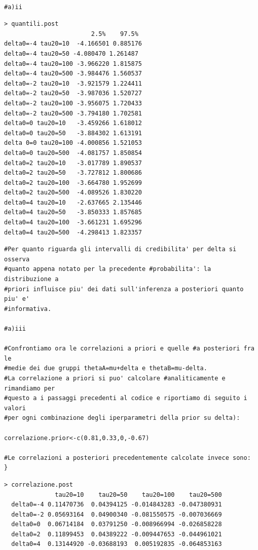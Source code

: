 \begin{itemize}
\begin{lstlisting}[style=R]

#a)ii
\end{lstlisting}
{
\color{red}
\begin{Verbatim}
> quantili.post
                        2.5%    97.5%
delta0=-4 tau20=10  -4.166501 0.885176
delta0=-4 tau20=50 -4.080470 1.261487
delta0=-4 tau20=100 -3.966220 1.815875
delta0=-4 tau20=500 -3.984476 1.560537
delta0=-2 tau20=10  -3.921579 1.224411
delta0=-2 tau20=50  -3.987036 1.520727
delta0=-2 tau20=100 -3.956075 1.720433
delta0=-2 tau20=500 -3.794180 1.702581
delta0=0 tau20=10   -3.459266 1.618012
delta0=0 tau20=50   -3.884302 1.613191
delta 0=0 tau20=100 -4.000856 1.521053
delta0=0 tau20=500  -4.081757 1.850854
delta0=2 tau20=10   -3.017789 1.890537
delta0=2 tau20=50   -3.727812 1.800686
delta0=2 tau20=100  -3.664780 1.952699
delta0=2 tau20=500  -4.089526 1.830220
delta0=4 tau20=10   -2.637665 2.135446
delta0=4 tau20=50   -3.850333 1.857685
delta0=4 tau20=100  -3.661231 1.695296
delta0=4 tau20=500  -4.298413 1.823357
\end{Verbatim}
}


\begin{lstlisting}[style=R]
#Per quanto riguarda gli intervalli di credibilita' per delta si osserva
#quanto appena notato per la precedente #probabilita': la distribuzione a
#priori influisce piu' dei dati sull'inferenza a posteriori quanto piu' e'
#informativa.

#a)iii

#Confrontiamo ora le correlazioni a priori e quelle #a posteriori fra le
#medie dei due gruppi thetaA=mu+delta e thetaB=mu-delta.
#La correlazione a priori si puo' calcolare #analiticamente e rimandiamo per
#questo a i passaggi precedenti al codice e riportiamo di seguito i valori
#per ogni combinazione degli iperparametri della prior su delta):

correlazione.prior<-c(0.81,0.33,0,-0.67)

#Le correlazioni a posteriori precedentemente calcolate invece sono:
}

\end{lstlisting}

{
\color{red}
\begin{Verbatim}
> correlazione.post
              tau20=10    tau20=50    tau20=100    tau20=500
  delta0=-4 0.11470736  0.04394125 -0.014843283 -0.047380931
  delta0=-2 0.05693164  0.04900340 -0.081550575 -0.007036669
  delta0=0  0.06714184  0.03791250 -0.008966994 -0.026858228
  delta0=2  0.11899453  0.04389222 -0.009447653 -0.044961021
  delta0=4  0.13144920 -0.03688193  0.005192835 -0.064853163
\end{Verbatim}
}



\end{itemize}
